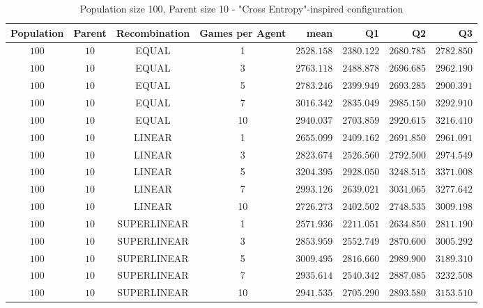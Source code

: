 \begin{table}[H]
\centering
\small
\begin{tabular}{c c c c r r r r}
Population & Parent & Recombination & Games per Agent & mean & Q1 & Q2 & Q3\\
\hline
$100$ & $10$ & EQUAL & 1 & $2528.158$ & $2380.122$ & $2680.785$ & $2782.850$\\
$100$ & $10$ & EQUAL & 3 & $2763.118$ & $2488.878$ & $2696.685$ & $2962.190$\\
$100$ & $10$ & EQUAL & 5 & $2783.246$ & $2399.949$ & $2693.285$ & $2900.391$\\
\hdashline
$100$ & $10$ & EQUAL & 7 & $3016.342$ & $2835.049$ & $2985.150$ & $3292.910$\\
\hdashline
$100$ & $10$ & EQUAL & 10 & $2940.037$ & $2703.859$ & $2920.615$ & $3216.410$\\
$100$ & $10$ & LINEAR & 1 & $2655.099$ & $2409.162$ & $2691.850$ & $2961.091$\\
$100$ & $10$ & LINEAR & 3 & $2823.674$ & $2526.560$ & $2792.500$ & $2974.549$\\
\hdashline
$100$ & $10$ & LINEAR & 5 & $3204.395$ & $2928.050$ & $3248.515$ & $3371.008$\\
\hdashline
$100$ & $10$ & LINEAR & 7 & $2993.126$ & $2639.021$ & $3031.065$ & $3277.642$\\
$100$ & $10$ & LINEAR & 10 & $2726.273$ & $2402.502$ & $2748.535$ & $3009.198$\\
$100$ & $10$ & SUPERLINEAR & 1 & $2571.936$ & $2211.051$ & $2634.850$ & $2811.190$\\
$100$ & $10$ & SUPERLINEAR & 3 & $2853.959$ & $2552.749$ & $2870.600$ & $3005.292$\\
\hdashline
$100$ & $10$ & SUPERLINEAR & 5 & $3009.495$ & $2816.660$ & $2989.900$ & $3189.310$\\
\hdashline
$100$ & $10$ & SUPERLINEAR & 7 & $2935.614$ & $2540.342$ & $2887.085$ & $3232.508$\\
$100$ & $10$ & SUPERLINEAR & 10 & $2941.535$ & $2705.290$ & $2893.580$ & $3153.510$\\
\end{tabular}
\caption{Population size 100, Parent size 10 - "Cross Entropy"-inspired configuration}
\end{table}


